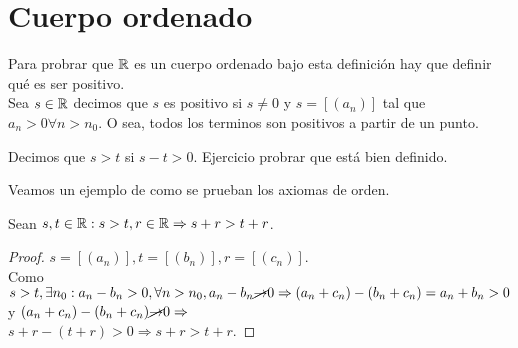 \section{Cuerpo ordenado}

Para probrar que $\mathbb{R}$ es un cuerpo ordenado bajo esta definición hay que definir qué es ser positivo. \\
Sea $s \in \mathbb{R}$ decimos que $s$ es positivo si $s \neq 0$ y $s = [(a_n)]$ tal que $a_n > 0 \forall n > n_0$. O sea, todos los terminos son positivos a partir de un punto. 

\begin{definition}
  Decimos que $s > t$ si $s-t > 0$.
  Ejercicio probrar que está bien definido.
\end{definition}

Veamos un ejemplo de como se prueban los axiomas de orden.

\begin{theorem}
  Sean $s, t \in \mathbb{R} : s > t, r \in \mathbb{R} \Rightarrow s+r > t+r$.
  \begin{proof}
    $s = [(a_n)], t = [(b_n)], r = [(c_n)]$. \\
    Como $s > t, \exists n_0 : a_n - b_n > 0, \forall n > n_0, a_n - b_n \cancel{\to} 0 \Rightarrow (a_n + c_n) - (b_n + c_n) = a_n + b_n > 0$ y $(a_n + c_n) - (b_n + c_n) \cancel{\to} 0 \Rightarrow$ \\
    $s + r - (t + r) > 0 \Rightarrow s+r > t+r$.
  \end{proof}
\end{theorem}

